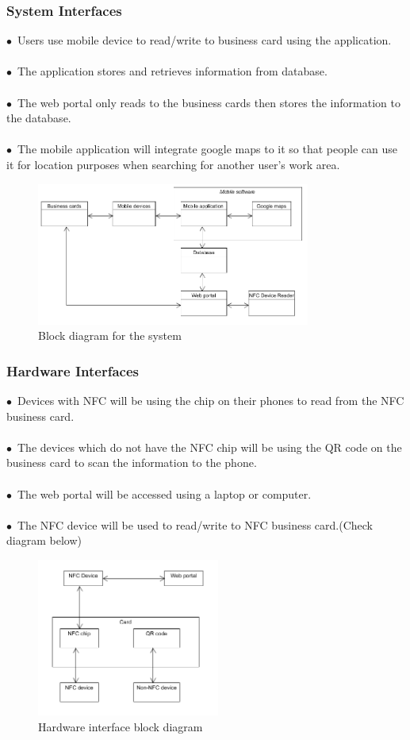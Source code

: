 \documentclass[english]{article}
\begin{document}
		\subsubsection{System Interfaces}

$\bullet$\ Users use mobile device to read/write to business card using the application.\\
\\$\bullet$\ The application stores and retrieves information from database.\\
\\$\bullet$\ The web portal only reads to the business cards then stores the information to the database.\\
\\$\bullet$\ The mobile application will integrate google maps to it so that people can use it for location purposes when searching for another user’s work area.

\begin{figure}[ht!]
\centering
\includegraphics[width=90mm]{system.png}
\caption{Block diagram for the system }
\end{figure}	
						
\subsubsection{Hardware Interfaces}				
$\bullet$\ Devices with NFC will be using the chip on their phones to read from the NFC business card.\\ \\$\bullet$\
The devices which do not have the NFC chip will be using the QR code on the business card to scan the information to the phone.\\ \\$\bullet$\
The web portal will be accessed using a laptop or computer.\\ \\$\bullet$\
The NFC device will be used to read/write to NFC business card.(Check diagram below)\\
\begin{figure}[ht!]
\centering
\includegraphics[width=60mm]{Hardware.png}
\caption{Hardware interface block diagram }
\end{figure}
\end{document}
